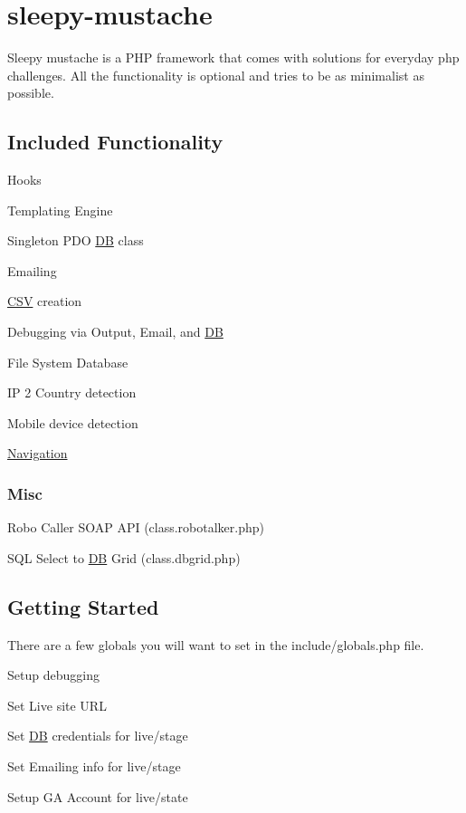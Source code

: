 \section*{sleepy-\/mustache}

Sleepy mustache is a P\-H\-P framework that comes with solutions for everyday php challenges. All the functionality is optional and tries to be as minimalist as possible.

\subsection*{Included Functionality}


\begin{DoxyItemize}
\item Hooks
\item Templating Engine
\item Singleton P\-D\-O \hyperlink{class_d_b}{D\-B} class
\item Emailing
\item \hyperlink{class_c_s_v}{C\-S\-V} creation
\item Debugging via Output, Email, and \hyperlink{class_d_b}{D\-B}
\item File System Database
\item I\-P 2 Country detection
\item Mobile device detection
\item \hyperlink{class_navigation}{Navigation}
\end{DoxyItemize}

\subsubsection*{Misc}


\begin{DoxyItemize}
\item Robo Caller S\-O\-A\-P A\-P\-I (class.\-robotalker.\-php)
\item S\-Q\-L Select to \hyperlink{class_d_b}{D\-B} Grid (class.\-dbgrid.\-php)
\end{DoxyItemize}

\subsection*{Getting Started}

There are a few globals you will want to set in the include/globals.\-php file.


\begin{DoxyItemize}
\item Setup debugging
\item Set Live site U\-R\-L
\item Set \hyperlink{class_d_b}{D\-B} credentials for live/stage
\item Set Emailing info for live/stage
\item Setup G\-A Account for live/state
\end{DoxyItemize}

